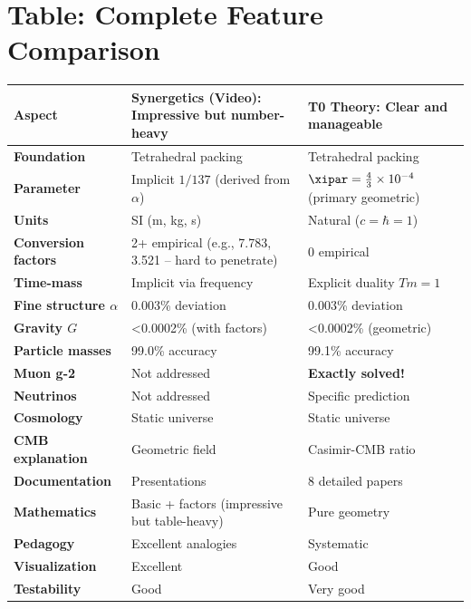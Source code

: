 	\section{Table: Complete Feature Comparison}
	
	\begin{center}
		\sloppy
		\begin{tabular}{p{3cm}p{5cm}p{5cm}}
			\toprule
			\textbf{Aspect} & \textbf{Synergetics (Video): Impressive but number-heavy} & \textbf{T0 Theory: Clear and manageable} \\
			\midrule
			\textbf{Foundation} & Tetrahedral packing & Tetrahedral packing \\
			\textbf{Parameter} & Implicit $1/137$ (derived from $\alpha$) & $\xipar = \frac{4}{3} \times 10^{-4}$ (primary geometric) \\
			\textbf{Units} & SI (m, kg, s) & Natural ($c=\hbar=1$) \\
			\textbf{Conversion factors} & 2+ empirical (e.g., 7.783, 3.521 -- hard to penetrate) & 0 empirical \\
			\textbf{Time-mass} & Implicit via frequency & Explicit duality $Tm=1$ \\
			\textbf{Fine structure $\alpha$} & 0.003\% deviation & 0.003\% deviation \\
			\textbf{Gravity $G$} & <0.0002\% (with factors) & <0.0002\% (geometric) \\
			\textbf{Particle masses} & 99.0\% accuracy & 99.1\% accuracy \\
			\textbf{Muon g-2} & Not addressed & \textbf{Exactly solved!} \\
			\textbf{Neutrinos} & Not addressed & Specific prediction \\
			\textbf{Cosmology} & Static universe & Static universe \\
			\textbf{CMB explanation} & Geometric field & Casimir-CMB ratio \\
			\textbf{Documentation} & Presentations & 8 detailed papers \\
			\textbf{Mathematics} & Basic + factors (impressive but table-heavy) & Pure geometry \\
			\textbf{Pedagogy} & Excellent analogies & Systematic \\
			\textbf{Visualization} & Excellent & Good \\
			\textbf{Testability} & Good & Very good \\
			\bottomrule
		\end{tabular}
	\end{center}
	
